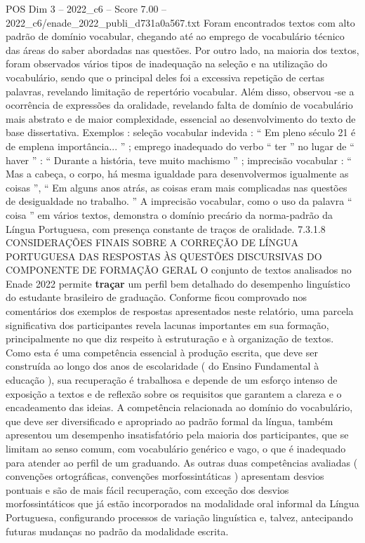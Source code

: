 \begin{textsample}{POS Dim 3 – 2022\_c6 – Score 7.00 – 2022\_c6/enade\_2022\_publi\_d731a0a567.txt}
Foram encontrados textos com alto padrão de domínio vocabular, chegando até ao emprego de vocabulário técnico das áreas do saber abordadas nas questões.
Por outro lado, na maioria dos textos, foram observados vários tipos de inadequação na seleção e na utilização do vocabulário, sendo que o principal deles foi a excessiva repetição de certas palavras, revelando limitação de repertório vocabular.
Além disso, observou -se a ocorrência de expressões da oralidade, revelando falta de domínio de vocabulário mais abstrato e de maior complexidade, essencial ao desenvolvimento do texto de base dissertativa.
Exemplos : seleção vocabular indevida : “ Em pleno século 21 é de emplena importância... ” ; emprego inadequado do verbo “ ter ” no lugar de “ haver ” : “ Durante a história, teve muito machismo ” ; imprecisão vocabular : “ Mas a cabeça, o corpo, há mesma igualdade para desenvolvermos igualmente as coisas ”, “ Em alguns anos atrás, as coisas eram mais complicadas nas questões de desigualdade no trabalho. ” A imprecisão vocabular, como o uso da palavra “ coisa ” em vários textos, demonstra o domínio precário da norma-padrão da Língua Portuguesa, com presença constante de traços de oralidade. 7.3.1.8 CONSIDERAÇÕES FINAIS SOBRE A CORREÇÃO DE LÍNGUA PORTUGUESA DAS RESPOSTAS ÀS QUESTÕES DISCURSIVAS DO COMPONENTE DE FORMAÇÃO GERAL O conjunto de textos analisados no Enade 2022 permite \textbf{traçar} um perfil bem detalhado do desempenho linguístico do estudante brasileiro de graduação.
Conforme ficou comprovado nos comentários dos exemplos de respostas apresentados neste relatório, uma parcela significativa dos participantes revela lacunas importantes em sua formação, principalmente no que diz respeito à estruturação e à organização de textos.
Como esta é uma competência essencial à produção escrita, que deve ser construída ao longo dos anos de escolaridade ( do Ensino Fundamental à educação ), sua recuperação é trabalhosa e depende de um esforço intenso de exposição a textos e de reflexão sobre os requisitos que garantem a clareza e o encadeamento das ideias.
A competência relacionada ao domínio do vocabulário, que deve ser diversificado e apropriado ao padrão formal da língua, também apresentou um desempenho insatisfatório pela maioria dos participantes, que se limitam ao senso comum, com vocabulário genérico e vago, o que é inadequado para atender ao perfil de um graduando.
As outras duas competências avaliadas ( convenções ortográficas, convenções morfossintáticas ) apresentam desvios pontuais e são de mais fácil recuperação, com exceção dos desvios morfossintáticos que já estão incorporados na modalidade oral informal da Língua Portuguesa, configurando processos de variação linguística e, talvez, antecipando futuras mudanças no padrão da modalidade escrita.

\end{textsample}
